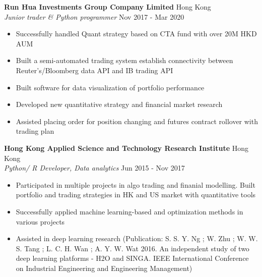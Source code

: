 \documentclass[a4paper]{article}
\begin{document}
\textbf{Run Hua Investments Group Company Limited} \hfill Hong Kong\\
\textit{Junior trader \& Python programmer} \hfill Nov 2017 - Mar 2020\\
\vspace{-1mm}
\begin{itemize} \itemsep 1pt
    \item Successfully handled Quant strategy based on CTA fund with over 20M HKD AUM
    \item Built a semi-automated trading system establish connectivity between Reuter's/Bloomberg data API and IB trading API
    \item Built software for data visualization of portfolio performance
    \item Developed new quantitative strategy and financial market research
        \item Assisted placing order for position changing and futures contract rollover with trading plan
\end{itemize}
\textbf{Hong Kong Applied Science and Technology Research Institute} \hfill Hong Kong\\
\textit{Python/ R Developer, Data analytics} \hfill Jun 2015 - Nov 2017\\
\vspace{-1mm}
\begin{itemize} \itemsep 1pt
    \item Participated in multiple projects in algo trading and finanial modelling. Built portfolio and trading strategies in HK and US market with quantitative tools
    \item Successfully applied machine learning-based and optimization methods in various projects
    \item Assisted in deep learning research (Publication: S. S. Y. Ng ; W. Zhu ; W. W. S. Tang ; L. C. H. Wan ; A. Y. W. Wat 2016. An independent study of two deep learning platforms - H2O and SINGA. IEEE International Conference on Industrial Engineering and Engineering Management)
\end{itemize}
\end{document}
